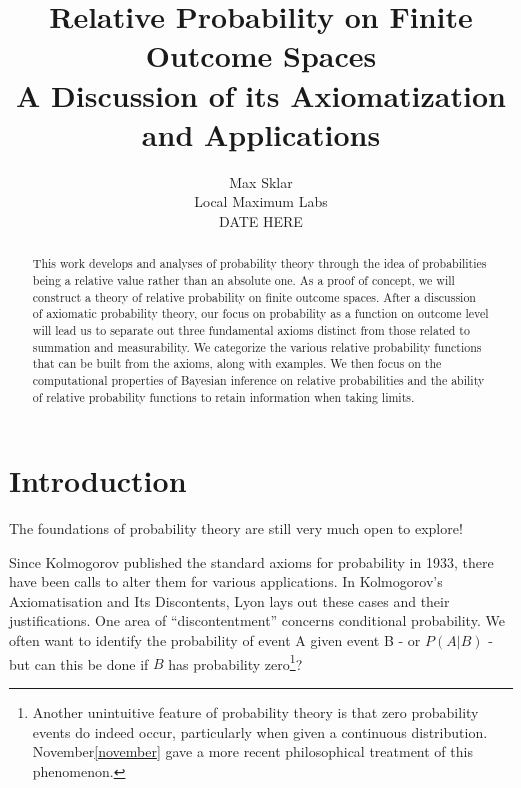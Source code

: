 \documentclass[twoside]{article}
\newcommand{\quotes}[1]{``#1''}
\theoremstyle{plain}%
\theoremstyle{definition}
\theoremstyle{remark}
\begin{document}
\parindent=0in
\parskip=12pt


\title{
  Relative Probability on Finite Outcome Spaces \\
  \large{
    A Discussion of its Axiomatization and Applications
  }
}

\author{Max Sklar\\ Local Maximum Labs \\ DATE HERE}
\date{}

\maketitle
\thispagestyle{empty}

\begin{abstract}
This work develops and analyses of probability theory through the idea of probabilities being a relative value rather than an absolute one. As a proof of concept, we will construct a theory of relative probability on finite outcome spaces. After a discussion of axiomatic probability theory, our focus on probability as a function on outcome level will lead us to separate out three fundamental axioms distinct from those related to summation and measurability. We categorize the various relative probability functions that can be built from the axioms, along with examples. We then focus on the computational properties of Bayesian inference on relative probabilities and the ability of relative probability functions to retain information when taking limits.
\end{abstract}

\tableofcontents
\newpage

\section{Introduction}

The foundations of probability theory are still very much open to explore!

Since Kolmogorov published the standard axioms for probability\cite{kolmogorov} in 1933, there have been calls to alter them for various applications. In Kolmogorov's Axiomatisation and Its Discontents\cite{lyon}, Lyon lays out these cases and their justifications.
One area of \quotes{discontentment} concerns conditional probability. We often want to identify the probability of event A given event B - or \(P(A|B)\) - but can this be done if \(B\) has probability zero\footnote{Another unintuitive feature of probability theory is that zero probability events do indeed occur, particularly when given a continuous distribution. November\ref{november} gave a more recent philosophical treatment of this phenomenon.}?
\end{document}
